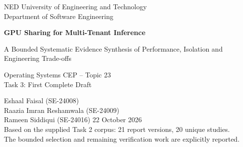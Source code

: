 \documentclass[12pt,a4paper]{article}
\begin{document}
\begin{titlepage}\centering
{\large NED University of Engineering and Technology\\Department of Software Engineering\par}\vspace{28mm}
{\LARGE\bfseries GPU Sharing for Multi-Tenant Inference\par}\vspace{6mm}
{\Large A Bounded Systematic Evidence Synthesis of Performance, Isolation and Engineering Trade-offs\par}\vspace{20mm}
{\large Operating Systems CEP -- Topic 23\\Task 3: First Complete Draft\par}\vspace{16mm}
Eshaal Faisal (SE-24008)\\Raazia Imran Reshamwala (SE-24009)\\Rameen Siddiqui (SE-24016)
\vfill 22 October 2026\\[6mm]
\small Based on the supplied Task 2 corpus: 21 report versions, 20 unique studies.\\The bounded selection and remaining verification work are explicitly reported.
\end{titlepage}
\begin{abstract}
GPU sharing for multi-tenant inference requires a choice among resource efficiency, request latency, isolation and implementation cost. This bounded review synthesizes 20 studies represented by 21 reports using the supplied search, screening, appraisal and extraction records. The register contains 4,189 occurrences and 4,075 canonical records after 114 duplicate links. It records 3,493 screening exclusions, 559 retained records not advanced under the stopping rule, and 23 source-assessed reports, of which two are excluded. The analysis classifies temporal scheduling, software spatial sharing, hardware partitions, runtime/API mediation and hybrid controls. It uses 200 appraisal items, 52 reported observations and two transparent calculations. The evidence supports conditional selection: increased concurrency can improve throughput while increasing latency; foreground protection can reduce background progress; and higher model density can introduce transfer, compatibility or trust costs. No pooled effect or universal winning mechanism is supported. Recommendations are linked to source conditions and remain limited by bounded selection, title-only screening, a single assessment pass and source-version uncertainty.
\end{abstract}
\tableofcontents\clearpage

\clearpage
\clearpage
\end{document}
